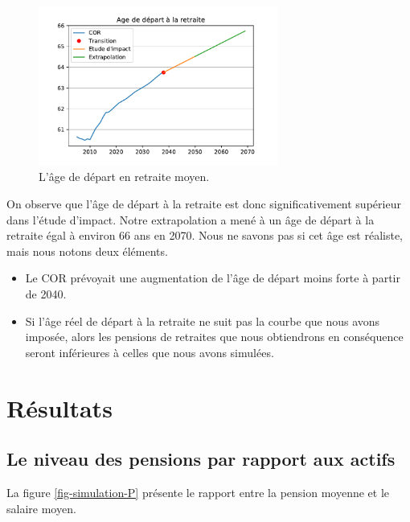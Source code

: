 \documentclass[10pt]{article}
\begin{document}
\begin{figure}
\begin{center}
\includegraphics[width=0.7\textwidth]{Simulation-Age.pdf}
\end{center}

\caption{L'âge de départ en retraite moyen.}
\label{fig-simulation-A}
\end{figure}

On observe que l'âge de départ à la retraite est donc 
significativement supérieur dans l'étude d'impact. 
Notre extrapolation a mené à un âge de départ à la retraite égal à 
environ 66 ans en 2070. 
Nous ne savons pas si cet âge est réaliste, mais nous notons deux éléments. 
\begin{itemize}
\item Le COR prévoyait une augmentation de l'âge de départ moins 
forte à partir de 2040. 
\item Si l'âge réel de départ à la retraite ne suit pas la courbe 
que nous avons imposée, alors les pensions de retraites que nous 
obtiendrons en conséquence seront inférieures à celles que nous avons 
simulées. 
\end{itemize}


\section{Résultats}


\subsection{Le niveau des pensions par rapport aux actifs}

La figure \ref{fig-simulation-P} présente le rapport entre la pension moyenne et le salaire moyen. 
\end{document}
